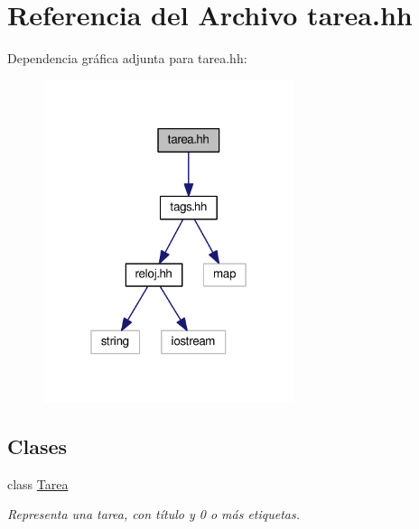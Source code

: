 \hypertarget{tarea_8hh}{\section{Referencia del Archivo tarea.\-hh}
\label{tarea_8hh}
}
Dependencia gráfica adjunta para tarea.\-hh\-:\nopagebreak
\begin{figure}[H]
\begin{center}
\leavevmode
\includegraphics[width=208pt]{tarea_8hh__incl}
\end{center}
\end{figure}
\subsection*{Clases}
\begin{DoxyCompactItemize}
\item 
class \hyperlink{class_tarea}{Tarea}
\begin{DoxyCompactList}\small\item\em Representa una tarea, con título y 0 o más etiquetas. \end{DoxyCompactList}\end{DoxyCompactItemize}
